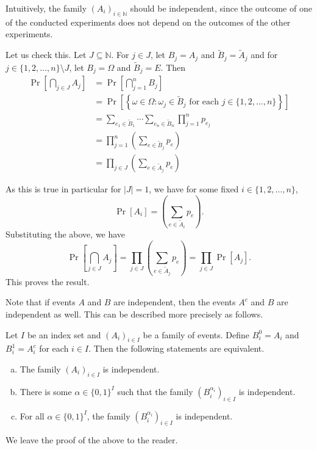 Intuitively, the family $(A_i)_{i\in\mathbb{N}}$ should be independent, since the outcome of one of the conducted experiments does not depend on the outcomes of the other experiments.

Let us check this. Let $J\subseteq\mathbb{N}$. For $j\in J$, let $B_j=A_j$ and $\tilde B_j=\tilde A_j$ and for $j\in\{1,2,\ldots,n\}\setminus J$, let $B_j=\Omega$ and $\tilde B_j=E$. Then
\begin{align*}
    \Pr\left[\bigcap_{j\in J}A_j\right] &= \Pr\left[\bigcap_{j=1}^n B_j\right] \\
    &= \Pr\left[\left\{\omega\in\Omega:\omega_j\in\tilde B_j\text{ for each }j\in\{1,2,\ldots,n\}\right\}\right] \\
    &= \sum_{e_1\in\tilde B_1} \cdots \sum_{e_n\in\tilde B_n} \prod_{j=1}^n p_{e_j} \\
    &= \prod_{j=1}^n \left(\sum_{e\in\tilde B_j}p_e\right) \\
    &= \prod_{j\in J} \left(\sum_{e\in\tilde A_j}p_e\right)
\end{align*}

As this is true in particular for $|J|=1$, we have for some fixed $i\in\{1,2,\ldots,n\}$,
$$\Pr[A_i] = \left(\sum_{e\in\tilde A_i}p_e\right).$$
Substituting the above, we have
$$
\Pr\left[\bigcap_{j\in J}A_j\right] 
= \prod_{j\in J} \left(\sum_{e\in\tilde A_j}p_e\right)
= \prod_{j\in J} \Pr[A_j].
$$
This proves the result.

\vspace{2mm}
Note that if events $A$ and $B$ are independent, then the events $A^c$ and $B$ are independent as well. This can be described more precisely as follows.

\begin{theorem}
    Let $I$ be an index set and $(A_i)_{i\in I}$ be a family of events. Define $B_i^0 = A_i$ and $B_i^1 = A_i^c$ for each $i\in I$. Then the following statements are equivalent.
    \begin{enumerate}[(a)]
        \item The family $(A_i)_{i\in I}$ is independent.
        \item There is some $\alpha\in\{0,1\}^I$ such that the family $(B_i^{\alpha_i})_{i\in I}$ is independent.
        \item For all $\alpha\in\{0,1\}^I$, the family $(B_i^{\alpha_i})_{i\in I}$ is independent.
    \end{enumerate}
\end{theorem}

We leave the proof of the above to the reader.

